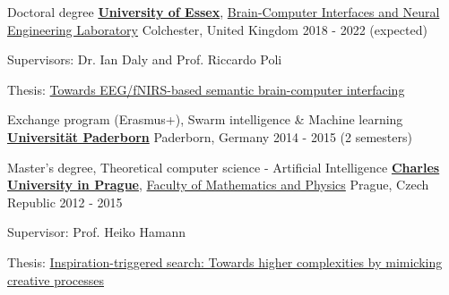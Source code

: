 

\begin{cventries}

  \cventry
    {Doctoral degree} %
    {\href{https://www.essex.ac.uk}{\textbf{University of Essex}}, \href{http://essexbcis.uk}{Brain-Computer Interfaces and Neural Engineering Laboratory}} %
    {Colchester, United Kingdom} %
    {2018 - 2022 (expected)} %
    {
      \begin{cvitems} %
        \item {Supervisors: Dr. Ian Daly and Prof. Riccardo Poli}
        \item {Thesis: \href{http://milanrybar.cz/semantic-brain-computer-interfacing}{Towards EEG/fNIRS-based semantic brain-computer interfacing}}
      \end{cvitems}
    }

  \cventry
{Exchange program (Erasmus+), Swarm intelligence \& Machine learning} %
{\href{http://www.uni-paderborn.de}{\textbf{Universität Paderborn}}} %
{Paderborn, Germany} %
{2014 - 2015 (2 semesters)} %
{
}

  \cventry
{Master's degree, Theoretical computer science - Artificial Intelligence} %
{\href{http://cuni.cz}{\textbf{Charles University in Prague}}, \href{http://www.mff.cuni.cz}
	{Faculty of Mathematics and Physics}} %
{Prague, Czech Republic} %
{2012 - 2015} %
{
	\begin{cvitems} %
		\item {Supervisor: Prof. Heiko Hamann}
		\item {Thesis: \href{http://milanrybar.cz/inspiration-triggered-search}{Inspiration-triggered search: Towards higher complexities by mimicking creative processes}  
		}
	\end{cvitems}
}


\end{cventries}
